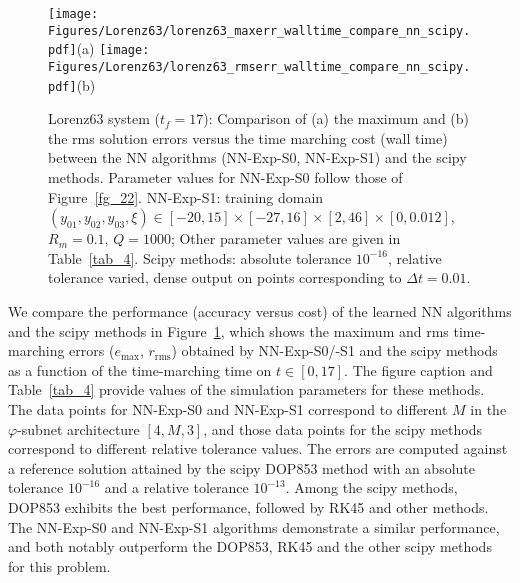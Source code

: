 \begin{figure}
  \centerline{
    \texttt{[image: Figures/Lorenz63/lorenz63\_maxerr\_walltime\_compare\_nn\_scipy.pdf]}(a)
    \texttt{[image: Figures/Lorenz63/lorenz63\_rmserr\_walltime\_compare\_nn\_scipy.pdf]}(b)
  }
  \caption{Lorenz63 system ($t_f=17$): Comparison of (a) the maximum and
    (b) the rms solution errors
    versus the time marching cost (wall time)
    between the NN algorithms (NN-Exp-S0, NN-Exp-S1) and the scipy methods.
    Parameter values for NN-Exp-S0 follow those of Figure~\ref{fg_22}.
    NN-Exp-S1: training domain $(y_{01},y_{02},y_{03},\xi)\in[-20,15]\times[-27,16]\times[2,46]\times[0,0.012]$,
    $R_m=0.1$, $Q=1000$; Other parameter values are given in Table~\ref{tab_4}.
    Scipy methods: %
    absolute tolerance $10^{-16}$, 
    relative tolerance varied,  dense output
    on points corresponding to $\Delta t=0.01$.
  }
  \label{fg_23}
\end{figure}

We compare the performance (accuracy versus cost) of the learned
NN algorithms and the scipy
methods  in Figure~\ref{fg_23}, which shows
the maximum and rms time-marching errors ($e_{\max}$, $r_{\text{rms}}$) obtained by
NN-Exp-S0/-S1 and the scipy methods as a function of the time-marching time
on $t\in[0,17]$. The figure caption and Table~\ref{tab_4} provide values
of the simulation parameters for these methods.
The data points for NN-Exp-S0 and NN-Exp-S1 correspond to different $M$
in the $\varphi$-subnet architecture $[4,M,3]$, and those data points for the scipy methods
correspond to different relative tolerance values.
The errors are computed against a reference solution attained by
the scipy DOP853 method with an absolute tolerance $10^{-16}$ and
a relative tolerance $10^{-13}$.
Among the scipy methods, DOP853 exhibits the best performance, followed by
RK45 and other methods. The NN-Exp-S0 and NN-Exp-S1 algorithms demonstrate
a similar performance, and both notably outperform the DOP853, RK45 and
the other scipy methods for this problem.



